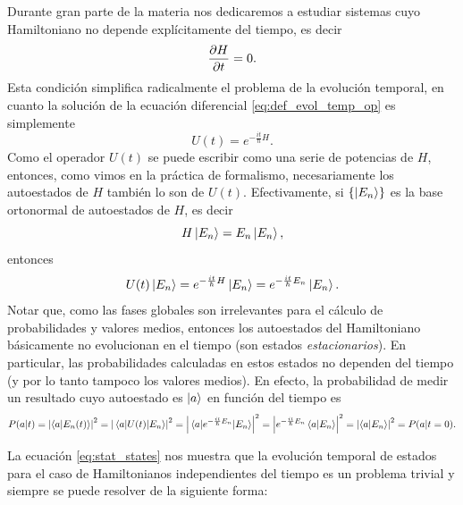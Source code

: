 \documentclass[10pt, a4paper]{article}
\numberwithin{equation}{subsection}
\begin{document}
Durante gran parte de la materia nos dedicaremos a estudiar sistemas cuyo
Hamiltoniano no depende explícitamente del tiempo, es decir
\begin{equation}
  \pdv{H}{t} = 0.
\end{equation}
Esta condición simplifica radicalmente el problema de la evolución temporal,
en cuanto la solución de la ecuación diferencial \eqref{eq:def_evol_temp_op} es
simplemente
\begin{equation}
  U(t) = e^{-\frac{it}{\hbar}H}.
\end{equation}
Como el operador $U(t)$ se puede escribir como una serie de potencias de $H$,
entonces, como vimos en la práctica de formalismo, necesariamente los
autoestados de $H$ también lo son de $U(t)$. Efectivamente, si
$\set{\ket{E_n}}$ es la base ortonormal de autoestados de $H$, es decir
\begin{equation}
  H\ket{E_n} = E_n\ket{E_n},
\end{equation}
entonces
\begin{equation} \label{eq:stat_states}
  U(t)\ket{E_n} = e^{-\frac{it}{\hbar}H}\ket{E_n} =
  e^{-\frac{it}{\hbar}E_n}\ket{E_n}.
\end{equation}
Notar que, como las fases globales son irrelevantes para el cálculo de
probabilidades y valores medios, entonces los autoestados del Hamiltoniano
básicamente no evolucionan en el tiempo (son estados \emph{estacionarios}).
En particular, las probabilidades calculadas en estos estados no dependen del
tiempo (y por lo tanto tampoco los valores medios). En efecto, la probabilidad
de medir un resultado cuyo autoestado es $\ket{a}$ en función del tiempo es
\begin{equation}
  P(a|t) = \abs{\braket{a}{E_n(t)}}^2 = \abs{\matrixel{a}{U(t)}{E_n}}^2 =
    \abs{\matrixel{a}{e^{-\frac{it}{\hbar}E_n}}{E_n}}^2 =
    \abs{e^{-\frac{it}{\hbar}E_n}\braket{a}{E_n}}^2 =
    \abs{\braket{a}{E_n}}^2 = P(a|t = 0).
\end{equation}

\bigbreak

La ecuación \eqref{eq:stat_states} nos muestra que la evolución temporal de
estados para el caso de Hamiltonianos independientes del tiempo es un problema
trivial y siempre se puede resolver de la siguiente forma:
\end{document}
